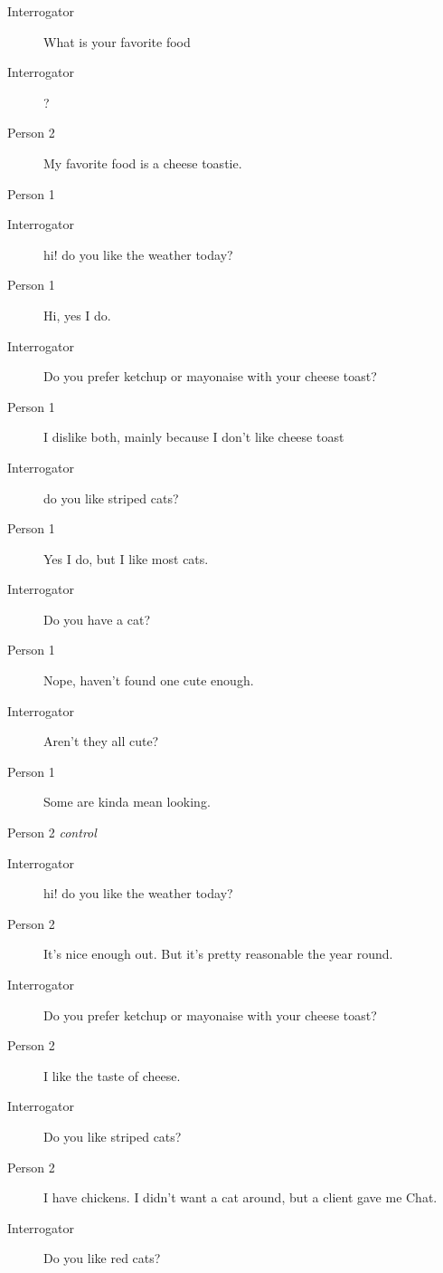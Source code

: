 \begin{itemize}
\begin{description}
\begin{description}
               \item [Interrogator] What is your favorite food
               \item [Interrogator] ?
               \item [Person 2] My favorite food is a cheese toastie.
            \end{description}
         \item [Second conversation] Person 1
            \begin{description}
               \item [Interrogator] hi! do you like the weather today?
               \item [Person 1] Hi, yes I do.
               \item [Interrogator] Do you prefer ketchup or mayonaise with your cheese toast?
               \item [Person 1] I dislike both, mainly because I don't like cheese toast
               \item [Interrogator] do you like striped cats?
               \item [Person 1] Yes I do, but I like most cats.
               \item [Interrogator] Do you have a cat?
               \item [Person 1] Nope, haven't found one cute enough.
               \item [Interrogator] Aren't they all cute?
               \item [Person 1] Some are kinda mean looking.
            \end{description}
         \item [Second conversation] Person 2 \textit{control}
            \begin{description}
               \item [Interrogator] hi! do you like the weather today?
               \item [Person 2] It's nice enough out. But it's pretty reasonable the year round.
               \item [Interrogator] Do you prefer ketchup or mayonaise with your cheese toast?
               \item [Person 2] I like the taste of cheese.
               \item [Interrogator] Do you like striped cats?
               \item [Person 2] I have chickens. I didn't want a cat around, but a client gave me Chat.
               \item [Interrogator] Do you like red cats?

\end{description}
\end{description}
\end{itemize}
